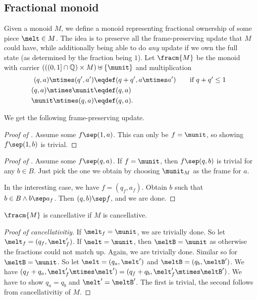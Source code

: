 \subsection{Fractional monoid}
\label{sec:fracm}

Given a monoid $M$, we define a monoid representing fractional ownership of some piece $\melt \in M$.
The idea is to preserve all the frame-preserving update that $M$ could have, while additionally being able to do \emph{any} update if we own the full state (as determined by the fraction being $1$).
Let $\fracm{M}$ be the monoid with carrier $(((0, 1] \cap \mathbb{Q}) \times M) \uplus \{\munit\}$ and multiplication
\begin{align*}
 (q, a) \mtimes (q', a') &\eqdef (q + q', a \mtimes a') \qquad \mbox{if $q+q'\le 1$} \\
 (q, a) \mtimes \munit &\eqdef (q,a) \\
 \munit \mtimes (q,a) &\eqdef (q,a).
\end{align*}

We get the following frame-preserving update.

\begin{proof}[Proof of ]
Assume some $f \sep (1, a)$. This can only be $f = \munit$, so showing $f \sep (1, b)$ is trivial.
\end{proof}

\begin{proof}[Proof of ]
	Assume some $f \sep (q, a)$. If $f = \munit$, then $f \sep (q, b)$ is trivial for any $b \in B$. Just pick the one we obtain by choosing $\munit_M$ as the frame for $a$.
	
	In the interesting case, we have $f = (q_f, a_f)$.
	Obtain $b$ such that $b \in B \land b \sep a_f$.
	Then $(q, b) \sep f$, and we are done.
\end{proof}

$\fracm{M}$ is cancellative if $M$ is cancellative.
\begin{proof}[Proof of cancellativitiy]
If $\melt_f = \munit$, we are trivially done.
So let $\melt_f = (q_f, \melt_f')$.
If $\melt = \munit$, then $\meltB = \munit$ as otherwise the fractions could not match up.
Again, we are trivially done.
Similar so for $\meltB = \munit$.
So let $\melt = (q_a, \melt')$ and $\meltB = (q_b, \meltB')$.
We have $(q_f + q_a, \melt_f' \mtimes \melt') = (q_f + q_b, \melt_f' \mtimes \meltB')$.
We have to show $q_a = q_b$ and $\melt' = \meltB'$.
The first is trivial, the second follows from cancellativitiy of $M$.
\end{proof}

